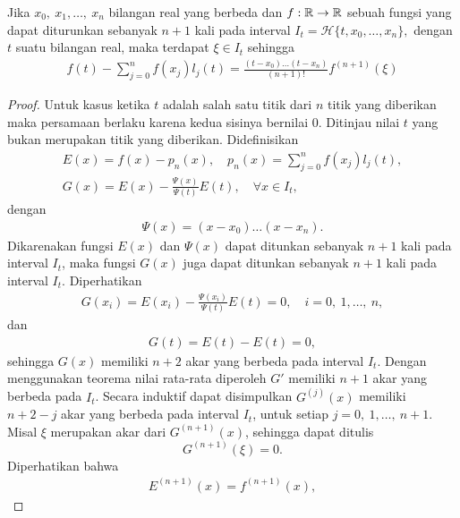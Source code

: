 \begin{teorema}\label{T_2.5.1}
    Jika $x_0,~x_1,\dots,~x_n$ bilangan real yang berbeda dan \mbox{$f:\mathbb{R} \to \mathbb{R}$} sebuah fungsi yang dapat diturunkan sebanyak $n+1$ kali pada interval $I_t=\mathcal{H} \{t,x_0,\dots,x_n\},$ dengan $t$ suatu bilangan real, maka terdapat $ \xi \in I_t$ sehingga
    \begin{align*}
        f(t) - \sum_{j=0}^n f(x_j)l_j(t) = \frac{(t-x_0)\dots(t-x_n)}{(n+1)!}f^{(n+1)}(\xi)
    \end{align*}
\end{teorema}
\begin{proof}
    Untuk kasus ketika $t$ adalah salah satu titik dari $n$ titik yang diberikan maka persamaan berlaku karena kedua sisinya bernilai $0$. Ditinjau nilai $t$ yang bukan merupakan titik yang diberikan. Didefinisikan
    \begin{gather*}
        E(x) = f(x) - p_n(x), \quad p_n(x)=\sum_{j=0}^n f(x_j)l_j(t), \\
        G(x) = E(x) - \frac{\Psi(x)}{\Psi(t)}E(t), \quad \forall x \in I_t,
    \end{gather*}
    dengan
    \begin{align*}
        \Psi(x) = (x-x_0)\dots(x-x_n).
    \end{align*}
    Dikarenakan fungsi $E(x)$ dan $\Psi(x)$ dapat ditunkan sebanyak $n+1$ kali pada interval $I_t$, maka fungsi $G(x)$ juga dapat ditunkan sebanyak $n+1$ kali pada interval $I_t$. Diperhatikan
    \begin{gather*}
        G(x_i) = E(x_i) - \frac{\Psi(x_i)}{\Psi(t)}E(t) = 0, \quad i=0,~1,\dots,~n,
    \end{gather*}
    dan
    \begin{gather*}   
        G(t) = E(t) - E(t) = 0,
    \end{gather*}
    sehingga $G(x)$ memiliki $n+2$ akar yang berbeda pada interval $I_t$. Dengan menggunakan teorema nilai rata-rata diperoleh $G'$ memiliki $n+1$ akar yang berbeda pada $I_t$. Secara induktif dapat disimpulkan $G^{(j)}(x)$ memiliki $n+2-j$ akar yang berbeda pada interval $I_t$, untuk setiap $j=0,~1,\dots,~n+1$. Misal $\xi$ merupakan akar dari $G^{(n+1)}(x)$, sehingga dapat ditulis
    \begin{equation*}
        G^{(n+1)}(\xi) = 0.
    \end{equation*}
    Diperhatikan bahwa
    \begin{align*}
        E^{(n+1)}(x) = f^{(n+1)}(x),
    \end{align*}

\end{proof}
